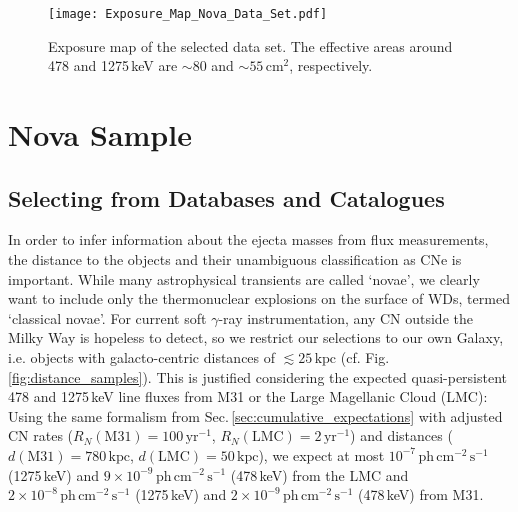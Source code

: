 \documentclass{aa}
\newcommand{\mrm}[1]{\mathrm{#1}}
\begin{document}
\begin{figure}[!htbp]
	\centering
	\texttt{[image: Exposure\_Map\_Nova\_Data\_Set.pdf]}
	\caption{Exposure map of the selected data set. The effective areas around 478 and 1275\,keV are $\sim 80$ and $\sim 55\,\mrm{cm^{2}}$, respectively.}
	\label{fig:expo_map}
\end{figure}

\section{Nova Sample}\label{sec:nova_catalogue}

\subsection{Selecting from Databases and Catalogues}\label{sec:sample_selection}
%
In order to infer information about the ejecta masses from flux measurements, the distance to the objects and their unambiguous classification as CNe is important.
%
While many astrophysical transients are called `novae', we clearly want to include only the thermonuclear explosions on the surface of WDs, termed `classical novae'.
%
For current soft $\gamma$-ray instrumentation, any CN outside the Milky Way is hopeless to detect, so we restrict our selections to our own Galaxy, i.e. objects with galacto-centric distances of $\lesssim 25\,\mrm{kpc}$ (cf. Fig.\,\ref{fig:distance_samples}).
%
This is justified considering the expected quasi-persistent 478 and 1275\,keV line fluxes from M31 or the Large Magellanic Cloud (LMC):
%
Using the same formalism from Sec.\,\ref{sec:cumulative_expectations} with adjusted CN rates ($R_{N}(\mrm{M31}) = 100\,\mrm{yr^{-1}}$, $R_{N}(\mrm{LMC}) = 2\,\mrm{yr^{-1}}$) and distances ($d(\mrm{M31}) = 780\,\mrm{kpc}$, $d(\mrm{LMC}) = 50\,\mrm{kpc}$), we expect at most $10^{-7}\,\mrm{ph\,cm^{-2}\,s^{-1}}$ (1275\,keV) and $9 \times 10^{-9}\,\mrm{ph\,cm^{-2}\,s^{-1}}$ (478\,keV) from the LMC and $2 \times 10^{-8}\,\mrm{ph\,cm^{-2}\,s^{-1}}$ (1275\,keV) and $2 \times 10^{-9}\,\mrm{ph\,cm^{-2}\,s^{-1}}$ (478\,keV) from M31.
\end{document}
